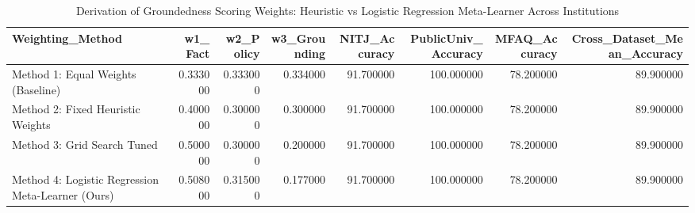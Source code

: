 \begin{table}
\caption{Derivation of Groundedness Scoring Weights: Heuristic vs Logistic Regression Meta-Learner Across Institutions}
\label{tab:meta_learner_weights}
\begin{tabular}{lrrrrrrr}
\toprule
Weighting_Method & w1_Fact & w2_Policy & w3_Grounding & NITJ_Accuracy & PublicUniv_Accuracy & MFAQ_Accuracy & Cross_Dataset_Mean_Accuracy \\
\midrule
Method 1: Equal Weights (Baseline) & 0.333000 & 0.333000 & 0.334000 & 91.700000 & 100.000000 & 78.200000 & 89.900000 \\
Method 2: Fixed Heuristic Weights & 0.400000 & 0.300000 & 0.300000 & 91.700000 & 100.000000 & 78.200000 & 89.900000 \\
Method 3: Grid Search Tuned & 0.500000 & 0.300000 & 0.200000 & 91.700000 & 100.000000 & 78.200000 & 89.900000 \\
Method 4: Logistic Regression Meta-Learner (Ours) & 0.508000 & 0.315000 & 0.177000 & 91.700000 & 100.000000 & 78.200000 & 89.900000 \\
\bottomrule
\end{tabular}
\end{table}
